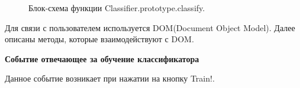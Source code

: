 \documentclass[14pt,a4paper]{extreport}
\begin{document}
    \begin{figure}[h]
    \caption{Блок-схема функции Classifier.prototype.classify.}
    \label{ris:image}
    \end{figure}
    \par Для связи с пользователем используется DOM(Document Object Model). Далее описаны методы, которые взаимодействуют с DOM.
    \newpage \par \textbf{Событие отвечающее за обучение классификатора}
    \\ \par Данное событие возникает при нажатии на кнопку Train!.
\end{document}
